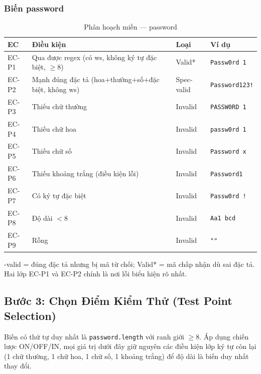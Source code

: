 \documentclass[12pt, a4paper]{report}
\begin{document}
\subsubsection{Biến password}
\begin{table}[H]
    \centering
    \caption{Phân hoạch miền — password}
    \begin{tabularx}{\linewidth}{C{1.4cm} L{6cm} C{1.6cm} X}
        \toprule
        \textbf{EC} & \textbf{Điều kiện} & \textbf{Loại} & \textbf{Ví dụ} \\
        \midrule
        EC-P1 & Qua được regex (có ws, không ký tự đặc biệt, $\ge 8$) & Valid* & \texttt{Passw0rd 1} \\
        EC-P2 & Mạnh đúng đặc tả (hoa+thường+số+đặc biệt, không ws) & Spec-valid & \texttt{Password123!} \\
        EC-P3 & Thiếu chữ thường & Invalid & \texttt{PASSW0RD 1} \\
        EC-P4 & Thiếu chữ hoa & Invalid & \texttt{passw0rd 1} \\
        EC-P5 & Thiếu chữ số & Invalid & \texttt{Password x} \\
        EC-P6 & Thiếu khoảng trắng (điều kiện lỗi) & Invalid & \texttt{Password1} \\
        EC-P7 & Có ký tự đặc biệt & Invalid & \texttt{Passw0rd !} \\
        EC-P8 & Độ dài $<8$ & Invalid & \texttt{Aa1 bcd} \\
        EC-P9 & Rỗng & Invalid & \verb|""| \\
        \bottomrule
    \end{tabularx}
\end{table}

\noindentSpec-valid = đúng đặc tả nhưng bị mã từ chối; Valid* = mã
chấp nhận dù sai đặc tả. Hai lớp EC-P1 và EC-P2 chính là nơi lỗi biểu hiện rõ nhất.

\subsection{Bước 3: Chọn Điểm Kiểm Thử (Test Point Selection)}
Biến có thứ tự duy nhất là \texttt{password.length} với ranh giới $\ge 8$. Áp dụng chiến lược
ON/OFF/IN, mọi giá trị dưới đây giữ nguyên các điều kiện lớp ký tự còn lại (1 chữ thường, 1
chữ hoa, 1 chữ số, 1 khoảng trắng) để độ dài là biến duy nhất thay đổi.
\end{document}
